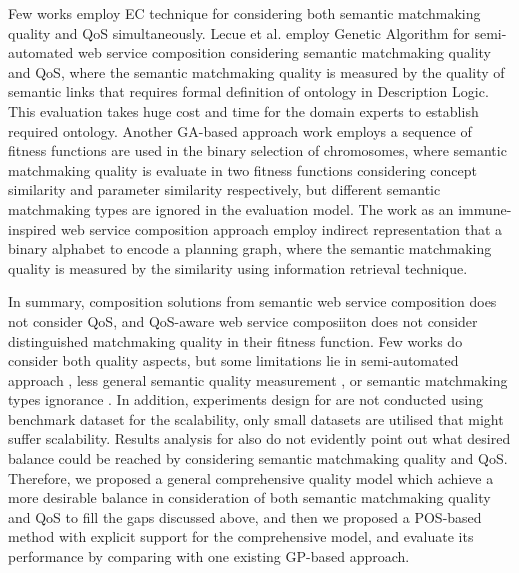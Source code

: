 \documentclass{IEEEtran}
\begin{document}
Few works \cite{lecue2009optimizing,fanjiang2014semantic,pop2009immune} employ EC technique for considering both semantic matchmaking quality and QoS simultaneously. Lecue et al. \cite{lecue2009optimizing} employ Genetic Algorithm for semi-automated web service composition considering semantic matchmaking quality and QoS, where the semantic matchmaking quality is measured by the quality of semantic links that requires formal definition of ontology in Description Logic. This evaluation takes huge cost and time for the domain experts to establish required ontology. Another GA-based approach work \cite{fanjiang2014semantic} employs a sequence of fitness functions are used in the binary selection of chromosomes, where semantic matchmaking quality is evaluate in two fitness functions considering concept similarity and parameter similarity respectively, but different semantic matchmaking types are ignored in the evaluation model. The work \cite{pop2009immune} as an immune-inspired web service composition approach employ indirect representation that a binary alphabet to encode a planning graph, where the semantic matchmaking quality is measured  by the similarity using information retrieval technique.


In summary, composition solutions from semantic web service composition \cite{boustil2014semantic,mier2015integrated, bansal2016generalized} does not consider QoS, and QoS-aware web service composiiton \cite{da2016particle,da2015graphevol,yu2013adaptive, gupta2015optimization,qi2010combining,ma2015hybrid} does not consider distinguished matchmaking quality in their fitness function. Few works do consider both quality aspects, but some limitations lie in semi-automated approach \cite{lecue2009optimizing}, less general semantic quality measurement \cite{lecue2009optimizing, pop2009immune}, or semantic matchmaking types ignorance \cite{pop2009immune}. In addition, experiments design for  \cite{lecue2009optimizing,fanjiang2014semantic,pop2009immune} are not conducted using benchmark dataset for the scalability, only small datasets are utilised that might suffer scalability. Results analysis for \cite{lecue2009optimizing,fanjiang2014semantic,pop2009immune} also do not evidently point out what desired balance could be reached by considering semantic matchmaking quality and QoS. Therefore, we proposed a general comprehensive quality model which achieve a more desirable balance in consideration of both semantic matchmaking quality and QoS to fill the gaps discussed above, and then we proposed a POS-based method with explicit support for the comprehensive model, and evaluate its performance by comparing with one existing GP-based approach.
\end{document}
